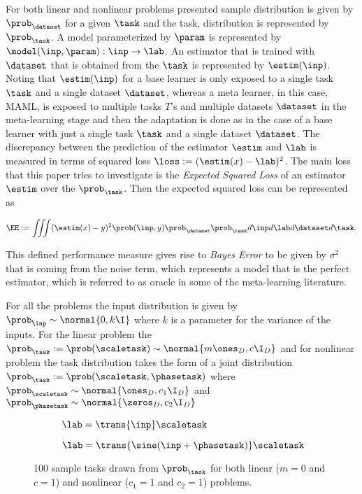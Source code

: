 For both linear and nonlinear problems presented sample distribution is given by $\prob_\dataset$ for a given $\task$ and the task, distribution is represented by $\prob_\task$. A model parameterized by $\param$ is represented by $\model(\inp, \param):\inp\to\lab$. An estimator that is trained with $\dataset$ that is obtained from the $\task$ is represented by $\estim(\inp)$. Noting that $\estim(\inp)$ for a base learner is only exposed to a single task $\task$ and a single dataset $\dataset$, whereas a meta learner, in this case, MAML, is exposed to multiple tasks $T$'s and multiple datasets $\dataset$ in the meta-learning stage and then the adaptation is done as in the case of a base learner with just a single task $\task$ and a single dataset $\dataset$.  The discrepancy between the prediction of the estimator $\estim$ and $\lab$ is measured in terms of squared loss $\loss:=(\estim(x)-\lab)^2$. The main loss that this paper tries to investigate is the \textit{Expected Squared Loss} of an estimator $\estim$ over the $\prob_{\task}$. Then the expected squared loss can be represented as

\begin{equation}\label{eq:ee}
  \EE:= \iiint(\estim(x) - y)^2\prob(\inp, y)\prob_{\dataset}\prob_{\task} d\inp d\lab d\dataset d\task.
\end{equation}

This defined performance measure gives rise to \textit{Bayes Error} to be given by $\sigma^2$ that is coming from the noise term, which represents a model that is the perfect estimator, which is referred to as oracle in some of the meta-learning literature.

For all the problems the input distribution is given by $\prob_\inp\sim\normal{0,k\I}$ where $k$ is a parameter for the variance of the inputs. For the linear problem the $\prob_\task:=\prob(\scaletask)\sim\normal{{m\ones_{D}},{c\I_{D}}}$ and for nonlinear problem the task distribution takes the form of a joint distribution $\prob_\task:=\prob(\scaletask, \phasetask)$ where $\prob_{\scaletask}\sim\normal{\ones_{D},c_1\I_{D}}$ and $\prob_{\phasetask}\sim\normal{\zeros_{D},c_2\I_{D}}$

\begin{figure}[ht!]
  \centering
  \begin{subfigure}[b]{0.49\textwidth}
    \centering
    \caption{$\lab = \trans{\inp}\scaletask$}
    \label{fig:lintasks}
  \end{subfigure}
  \begin{subfigure}[b]{0.49\textwidth}
    \centering
    \caption{$\lab = \trans{\sine(\inp+\phasetask)}\scaletask$}
    \label{fig:nonlintasks}
  \end{subfigure}
  \caption{100 sample tasks drawn from $\prob_\task$ for both linear ($m=0$ and $c=1$) and nonlinear ($c_1=1$ and $c_2=1$) problems.}
\end{figure}

